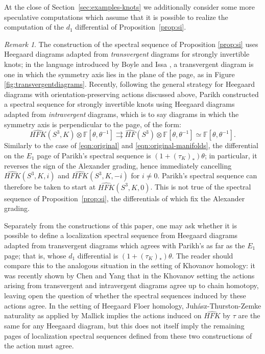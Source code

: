 \documentclass[11pt,reqno]{amsart}
\theoremstyle{definition}
\theoremstyle{remark}
\newtheorem{rem}[thm]{Remark}
\newcommand{\bF}{\mathbb{F}}
\newcommand{\HF}{\mathit{HF}}
\newcommand{\HFK}{\mathit{HFK}}
\newcommand\HFhat{\widehat{\HF}}
\newcommand\HFKhat{\widehat{\HFK}}
\numberwithin{equation}{section}
\begin{document}
At the close of Section~\ref{sec:examples-knots} we additionally consider some more speculative computations which assume that it is possible to realize the computation of the $d_1$ differential of Proposition~\ref{prop:si}.



\begin{rem} The construction of the spectral sequence of Proposition \ref{prop:si} uses Heegaard diagrams adapted from \emph{transvergent} diagrams for strongly invertible knots; in the language introduced by Boyle and Issa \cite{Boyle:alternating,BI:genera}, a transvergent diagram is one in which the symmetry axis lies in the plane of the page, as in Figure \ref{fig:transvergentdiagrams}. Recently, following the general strategy for Heegaard diagrams with orientation-preserving actions discussed above, Parikh \cite{Parikh} constructed a spectral sequence for strongly invertible knots using Heegaard diagrams adapted from \emph{intravergent} diagrams, which is to say diagrams in which the symmetry axis is perpendicular to the page, of the form:
%
\[ \HFKhat(S^3,K) \otimes \bF[\theta, \theta^{-1}] \rightrightarrows \HFhat(S^3) \otimes \bF[\theta, \theta^{-1}] \simeq \bF[\theta, \theta^{-1}].\]
%
Similarly to the case of \eqref{eqn:original} and \eqref{eqn:original-manifolds}, the differential on the $E_1$ page of Parikh's spectral sequence is $(1+(\tau_K)_*)\theta$; in particular, it reverses the sign of the Alexander grading, hence immediately cancelling $\HFKhat(S^3,K,i)$ and $\HFKhat(S^3,K,-i)$ for $i\neq 0$. Parikh's spectral sequence can therefore be taken to start at $\HFKhat(S^3,K,0)$. This is not true of the spectral sequence of Proposition~\ref{prop:si}, the differentials of which fix the Alexander grading.

Separately from the constructions of this paper, one may ask whether it is possible to define a localization spectral sequence from Heegaard diagrams adapted from transvergent diagrams which agrees with Parikh's as far as the $E_1$ page; that is, whose $d_1$ differential is $(1+(\tau_K)_*)\theta$. The reader should compare this to the analogous situation in the setting of Khovanov homology: it was recently shown by Chen and Yang \cite{CY:flip} that in the Khovanov setting the actions arising from transvergent and intravergent diagrams agree up to chain homotopy, leaving open the question of whether the spectral sequences induced by these actions agree. In the setting of Heegaard Floer homology, Juh{\'a}sz-Thurston-Zemke naturality \cite{JTNaturality} as applied by Mallick \cite[Section 6]{Mallick:surgery} implies the actions induced on $\widehat{HFK}$ by $\tau$ are the same for any Heegaard diagram, but this does not itself imply the remaining pages of localization spectral sequences defined from these two constructions of the action must agree. \end{rem}
\end{document}
